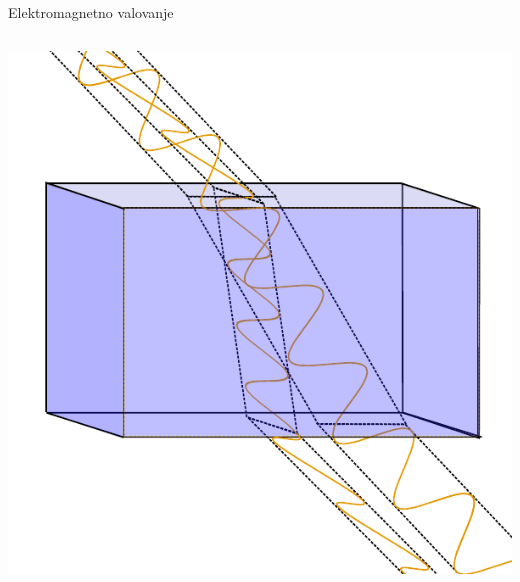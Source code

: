\documentclass{beamer}
\begin{document}
\begin{frame}{Elektromagnetno valovanje}
\begin{columns}
\begin{center}
\includegraphics[width=.8\textwidth]{./Slike/Rays_passing_through_birefringent_material}
\end{center}

\end{columns}
\end{frame}
\end{document}

